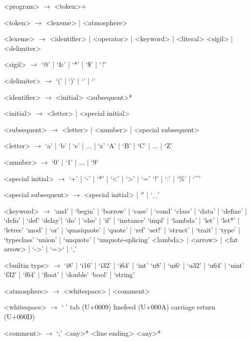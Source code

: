 \setlength{\grammarindent}{6em}
    \begin{grammar}
        <program> $\to$ <token>+

        <token> $\to$ <lexeme> | <atmosphere>

        <lexeme> $\to$ <identifier> | <operator> | <keyword> | <literal>
                    \alt <sigil> | <delimiter>

        <sigil> $\to$ `@' | `&' | `*' | `\$' | `?'

        <delimiter> $\to$ `(' | `)' | `{' | `}'

        <identifier> $\to$ <initial> <subsequent>*

        <initial> $\to$ <letter> | <special initial>

        <subsequent> $\to$ <letter> | <number> | <special subsequent>

        <letter> $\to$ `a' | `b' | `c' | ... | `z'
                 \alt `A' | `B' | `C' | ... | `Z'

        <number> $\to$ `0' | `1' | ... | `9'

        <special initial> $\to$ `+' | `-' | `*' | `<' | `>' | `='
                          \alt `!' | `:' | `\%' | `^'

        <special subsequent> $\to$ <special initial> | `\'' | `_'

        <keyword> $\to$ `and' | `begin'  | `borrow' | `case' | `cond'
                  \alt `class' | `data' | `define' | `defn' | `def'
                  \alt `delay'| `do' | `else' | `if' | `instance'
                  \alt `impl' | `lambda' | `let' | `let*' | `letrec'
                  \alt `mod' | `or' | `quasiquote' | `quote' | `ref'
                  \alt `set!' | `struct' | `trait' | `type' | `typeclass'
                  \alt `union' |  `unquote' | `unquote-splicing'
                  \alt <lambda> | <arrow> | <fat arrow>
                  \alt \lit{|}  | `->' | `=>` | `,'

        <builtin type> $\to$ `i8' | `i16' | `i32' | `i64' | `int'
                        \alt `u8' | `ui6` | `u32' | `u64' | `uint'
                        \alt `f32' | `f64' | `float' | `double'
                        \alt `bool' | `string'

        <atmosphere> $\to$ <whitespace> | <comment>

        <whitespace> $\to$ ` '
                    \alt tab (U+0009)
                    \alt linefeed (U+000A)
                    \alt carriage return (U+000D)

        <comment> $\to$ `;' <any>* <line ending>
                  \alt \lit{\#|} <any>* \lit{|\#}

    \end{grammar}

